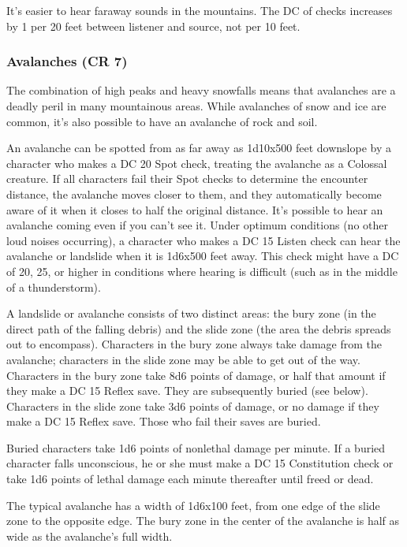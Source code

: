 It's easier to hear faraway sounds in the mountains. The DC of  checks increases 
by 1 per 20 feet between listener and source, not per 10 feet.

\subsubsection{Avalanches (CR 7)}

The combination of high peaks and heavy snowfalls means that avalanches are a deadly 
peril in many mountainous areas. While avalanches of snow and ice are common, it's 
also possible to have an avalanche of rock and soil.

An avalanche can be spotted from as far away as 1d10x500 feet 
downslope by a character who makes a DC 20 Spot check, treating the avalanche as 
a Colossal creature. If all characters fail their Spot checks to determine the 
encounter distance, the avalanche moves closer to them, and they automatically 
become aware of it when it closes to half the original distance. It's possible 
to hear an avalanche coming even if you can't see it. Under optimum conditions 
(no other loud noises occurring), a character who makes a DC 15 Listen check can 
hear the avalanche or landslide when it is 1d6x500 feet away. 
This check might have a DC of 20, 25, or higher in conditions where hearing is 
difficult (such as in the middle of a thunderstorm). 

A landslide or avalanche consists of two distinct areas: the bury zone (in the 
direct path of the falling debris) and the slide zone (the area the debris spreads 
out to encompass). Characters in the bury zone always take damage from the avalanche; 
characters in the slide zone may be able to get out of the way. Characters in the 
bury zone take 8d6 points of damage, or half that amount if they make a DC 15 Reflex 
save. They are subsequently buried (see below). Characters in the slide zone take 
3d6 points of damage, or no damage if they make a DC 15 Reflex save. Those who 
fail their saves are buried. 

Buried characters take 1d6 points of nonlethal damage per minute. If a buried character 
falls unconscious, he or she must make a DC 15 Constitution check or take 1d6 points 
of lethal damage each minute thereafter until freed or dead.

The typical avalanche has a width of 1d6x100 feet, from one edge 
of the slide zone to the opposite edge. The bury zone in the center of the avalanche 
is half as wide as the avalanche's full width.

